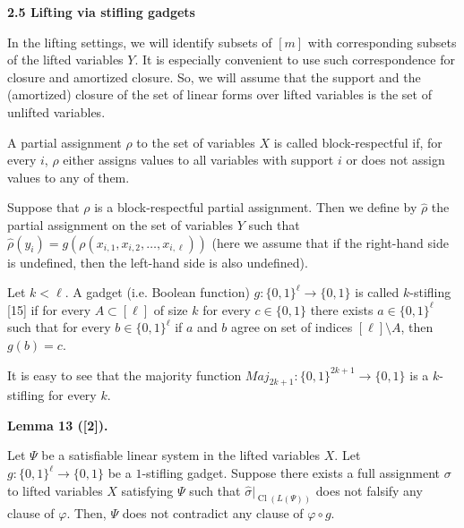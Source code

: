 \par\medskip\noindent\textbf{
2.5 Lifting via stifling gadgets}\par


In the lifting settings, we will identify subsets of $[m]$ with corresponding subsets of the
lifted variables $Y$.
It is especially convenient to use such correspondence for closure and amortized closure.
So, we will assume that the support and the (amortized) closure of the set of linear forms over
lifted variables is the set of unlifted variables.\par



A partial assignment $\rho$ to the set of variables $X$ is called block-respectful if,
for every $i$, $\rho$ either assigns values to all variables with support $i$ or does not assign
values to any of them.\par



Suppose that $\rho$ is a block-respectful partial assignment.
Then we define by $\hat{\rho}$ the partial assignment on the set of variables $Y$ such that
$\hat{\rho}(y_{i})=g(\rho(x_{i,1},x_{i,2},\dots,x_{i,\ell}))$ (here we assume that if the
right-hand side is undefined, then the left-hand side is also undefined).\par



Let $k<\ell$. A gadget (i.e. Boolean function) $g:\{0,1\}^{\ell}\to\{0,1\}$ is called
$k$-stifling [15] if for every $A\subset[\ell]$ of size $k$ for every
$c\in\{0,1\}$ there exists $a\in\{0,1\}^{\ell}$ such that for every $b\in\{0,1\}^{\ell}$
if $a$ and $b$ agree on set of indices $[\ell]\setminus A$, then $g(b)=c$.\par



It is easy to see that the majority function $Maj_{2k+1}:\{0,1\}^{2k+1}\to\{0,1\}$
is a $k$-stifling for every $k$.\par



\par\medskip\noindent\textbf{
Lemma 13 ([2]).
}\par



Let $\Psi$ be a satisfiable linear system in the lifted variables $X$.
Let $g\colon\{0,1\}^{\ell}\to\{0,1\}$ be a $1$-stifling gadget.
Suppose there exists a full assignment $\sigma$ to lifted variables $X$ satisfying
$\Psi$ such that $\hat{\sigma}|_{\operatorname{Cl}(L(\Psi))}$ does not falsify any clause of $\varphi$.
Then, $\Psi$ does not contradict any clause of $\varphi\circ g$.\par



